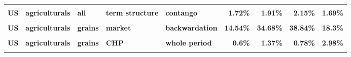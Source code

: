 \documentclass[
  authoryear,
  preprint,
  3p]{elsarticle}
\begin{document}
\begin{landscape}
\begin{longtable}[t]{>{}l>{}l>{}l>{}l>{}l>{}r>{}r>{}r>{}r}
\textbf{\cellcolor{gray!10}{US}} & \textbf{\cellcolor{gray!10}{agriculturals}} & \textbf{\cellcolor{gray!10}{all}} & \textbf{\cellcolor{gray!10}{term structure}} & \textbf{\cellcolor{gray!10}{backwardation}} & \textcolor[HTML]{4285f4}{\textbf{\cellcolor{gray!10}{1.2\%}}} & \textcolor[HTML]{4285f4}{\textbf{\cellcolor{gray!10}{1.27\%}}} & \textcolor[HTML]{4285f4}{\textbf{\cellcolor{gray!10}{1.93\%}}} & \textcolor[HTML]{4285f4}{\textbf{\cellcolor{gray!10}{3.55\%}}}\\
\addlinespace
\textbf{US} & \textbf{agriculturals} & \textbf{all} & \textbf{term structure} & \textbf{contango} & \textcolor[HTML]{4285f4}{\textbf{1.72\%}} & \textcolor[HTML]{4285f4}{\textbf{1.91\%}} & \textcolor[HTML]{4285f4}{\textbf{2.15\%}} & \textcolor[HTML]{4285f4}{\textbf{1.69\%}}\\
\textbf{\cellcolor{gray!10}{US}} & \textbf{\cellcolor{gray!10}{agriculturals}} & \textbf{\cellcolor{gray!10}{grains}} & \textbf{\cellcolor{gray!10}{market}} & \textbf{\cellcolor{gray!10}{whole period}} & \textcolor[HTML]{4285f4}{\textbf{\cellcolor{gray!10}{16.44\%}}} & \textcolor[HTML]{4285f4}{\textbf{\cellcolor{gray!10}{29.28\%}}} & \textcolor[HTML]{4285f4}{\textbf{\cellcolor{gray!10}{42.09\%}}} & \textcolor[HTML]{4285f4}{\textbf{\cellcolor{gray!10}{19.27\%}}}\\
\textbf{US} & \textbf{agriculturals} & \textbf{grains} & \textbf{market} & \textbf{backwardation} & \textcolor[HTML]{4285f4}{\textbf{14.54\%}} & \textcolor[HTML]{4285f4}{\textbf{34.68\%}} & \textcolor[HTML]{4285f4}{\textbf{38.84\%}} & \textcolor[HTML]{4285f4}{\textbf{18.3\%}}\\
\textbf{\cellcolor{gray!10}{US}} & \textbf{\cellcolor{gray!10}{agriculturals}} & \textbf{\cellcolor{gray!10}{grains}} & \textbf{\cellcolor{gray!10}{market}} & \textbf{\cellcolor{gray!10}{contango}} & \textcolor[HTML]{4285f4}{\textbf{\cellcolor{gray!10}{18.73\%}}} & \textcolor[HTML]{4285f4}{\textbf{\cellcolor{gray!10}{23.95\%}}} & \textcolor[HTML]{4285f4}{\textbf{\cellcolor{gray!10}{44.4\%}}} & \textcolor[HTML]{4285f4}{\textbf{\cellcolor{gray!10}{20.71\%}}}\\
\textbf{US} & \textbf{agriculturals} & \textbf{grains} & \textbf{CHP} & \textbf{whole period} & \textcolor[HTML]{4285f4}{\textbf{0.6\%}} & \textcolor[HTML]{4285f4}{\textbf{1.37\%}} & \textcolor[HTML]{4285f4}{\textbf{0.78\%}} & \textcolor[HTML]{4285f4}{\textbf{2.98\%}}\\
\addlinespace
\textbf{\cellcolor{gray!10}{US}} & \textbf{\cellcolor{gray!10}{agriculturals}} & \textbf{\cellcolor{gray!10}{grains}} & \textbf{\cellcolor{gray!10}{CHP}} & \textbf{\cellcolor{gray!10}{backwardation}} & \textcolor[HTML]{4285f4}{\textbf{\cellcolor{gray!10}{0.77\%}}} & \textcolor[HTML]{4285f4}{\textbf{\cellcolor{gray!10}{2.63\%}}} & \textcolor[HTML]{4285f4}{\textbf{\cellcolor{gray!10}{1.04\%}}} & \textcolor[HTML]{4285f4}{\textbf{\cellcolor{gray!10}{5.46\%}}}\\

\end{longtable}
\end{landscape}
\end{document}
